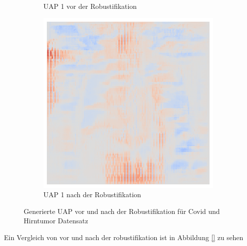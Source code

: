\begin{figure}[ht!]
\begin{subfigure}{0.19\linewidth}
        \caption{UAP 1 vor der Robustifikation}
    \end{subfigure}
    \begin{subfigure}{0.19\linewidth}
        \centering
        \includegraphics[height=1\linewidth]{01-images/05-resultate/uap_efficientnet/uap0-efficientnetv2m-covid-n200-robustificationslevel9.png}
        \caption{UAP 1 nach der Robustifikation}
    \end{subfigure}
    \caption{Generierte UAP vor und nach der Robustifikation für Covid und Hirntumor Datensatz}
    \label{fig:uap-resnet18-mri-rob0}
\end{figure}

Ein Vergleich von vor und nach der robustifikation ist in Abbildung \ref{} zu sehen

